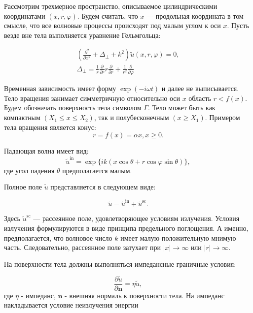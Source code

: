 Рассмотрим трехмерное пространство, описываемое цилиндрическими координатами $(x, r, \varphi)$. Будем считать, что $x$ — продольная координата в том смысле, что все волновые процессы происходят под малым углом к оси $x$. Пусть везде вне тела выполняется уравнение Гельмгольца:

\begin{eqnarray}
\label{eq:helmholtz}
\left(\frac{\partial^2}{\partial x^2} + \Delta_\perp + k^2\right) \tilde{u}(x, r, \varphi) = 0, \\
\Delta_\perp = \frac{1}{r} \frac{\partial}{\partial r} r \frac{\partial}{\partial r} + \frac{1}{r^2} \frac{\partial}{\partial \varphi}
\end{eqnarray}

Временная зависимость имеет форму $\exp(-i\omega t)$ и далее не выписывается. Тело вращения занимает симметричную относительно оси $x$  область $r < f(x)$. Будем обозначать поверхность тела символом $\Gamma$. Тело может быть как компактным $(X_1 \leq x \leq X_2)$, так и полубесконечным $(x \geq X_1)$. Примером тела вращения является конус:
\begin{equation}
\label{eq:straightline}
r = f(x) = \alpha x, x\geq 0.
\end{equation}

Падающая волна имеет вид:
\begin{equation}
\label{eq:inc_small_angle}
\tilde{u}^{\text{in}} = \exp\{ik(x\cos \theta + r \cos \varphi \sin \theta)\},
\end{equation}
где угол падения $\theta$ предполагается малым. 

Полное поле $\tilde{u}$ представляется в следующем виде:

\begin{equation}
\tilde{u} = \tilde{u}^{\text{in}} + \tilde{u} ^ {\text{sc}}.
\end{equation}

Здесь $\tilde{u}^{\text{sc}}$ — рассеянное поле, удовлетворяющее условиям излучения. Условия излучения формулируются в виде принципа предельного поглощения. А именно, предполагается, что волновое число $k$ имеет малую положительную мнимую часть. Следовательно, рассеянное поле затухает при $|x| \rightarrow \infty$ или $|r| \rightarrow \infty$.

На поверхности тела должны выполняться импедансные граничные условия:

\begin{equation}
\label{eq:imp_usl}
\frac{\partial \tilde{u}}{\partial \textbf{n}} = \eta \tilde{u},
\end{equation}
где $\eta$ - импеданс, $\textbf{n}$ - внешняя нормаль к поверхности тела. На импеданс накладывается условие неизлучения энергии

